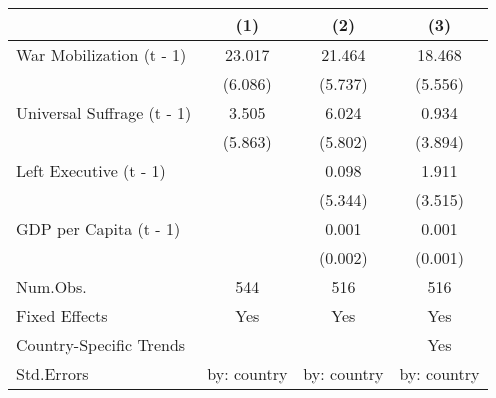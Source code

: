\begin{longtable}{lccc}
\toprule
  & (1) & (2) & (3) \\ 
\midrule\addlinespace[2.5pt]
War Mobilization (t - 1) & 23.017 & 21.464 & 18.468 \\ 
 & (6.086) & (5.737) & (5.556) \\ 
Universal Suffrage (t - 1) & 3.505 & 6.024 & 0.934 \\ 
 & (5.863) & (5.802) & (3.894) \\ 
Left Executive (t - 1) &  & 0.098 & 1.911 \\ 
 &  & (5.344) & (3.515) \\ 
GDP per Capita (t - 1) &  & 0.001 & 0.001 \\ 
 &  & (0.002) & (0.001) \\ 
Num.Obs. & 544 & 516 & 516 \\ 
Fixed Effects & Yes & Yes & Yes \\ 
Country-Specific Trends &  &  & Yes \\ 
Std.Errors & by: country & by: country & by: country \\ 
\bottomrule
\end{longtable}

